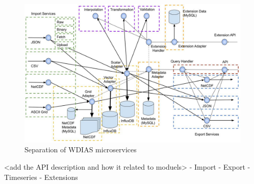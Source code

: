 \begin{figure}[htp]
    \centering
    \includegraphics[width=1\textwidth]{method/microservice/separation_microservices-v3.jpg}
    \caption{Separation of WDIAS microservices}
    \label{fi:wdias_micro_separation}
\end{figure}

<add the API description and how it related to moduels>
- Import
- Export
- Timeseries
- Extensions
